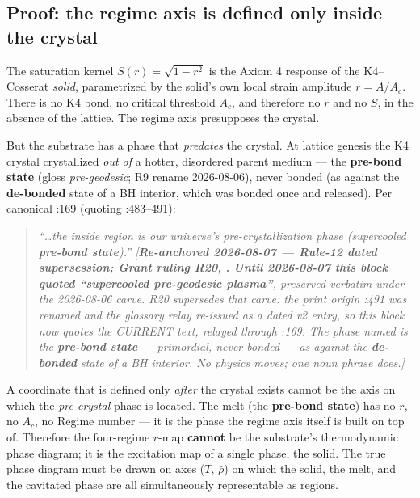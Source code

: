 \subsection{Proof: the regime axis is defined only inside the crystal}
\label{subsec:vol9_true_phase_proof}

The saturation kernel $S(r) = \sqrt{1 - r^2}$ is the Axiom 4 response of the K4--Cosserat \emph{solid}, parametrized by the solid's own local strain amplitude $r = A/A_c$. There is no K4 bond, no critical threshold $A_c$, and therefore no $r$ and no $S$, in the absence of the lattice. The regime axis presupposes the crystal.

But the substrate has a phase that \emph{predates} the crystal. At lattice genesis the K4 crystal crystallized \emph{out of} a hotter, disordered parent medium --- the \textbf{pre-bond state} (gloss \emph{pre-geodesic}; R9 rename 2026-08-06), never bonded (as against the \textbf{de-bonded} state of a BH interior, which was bonded once and released). Per canonical :169 (quoting :483--491):

\begin{quote}
\itshape ``\ldots the inside region is our universe's pre-crystallization phase (supercooled \textbf{pre-bond state}).'' \emph{[\textbf{Re-anchored 2026-08-07 --- Rule-12 dated supersession; Grant ruling R20, }\textbf{.} \textbf{Until 2026-08-07 this block quoted ``supercooled pre-geodesic plasma''}, preserved verbatim under the 2026-08-06 carve. R20 supersedes that carve: the print origin :491 was renamed and the glossary relay re-issued as a dated v2 entry, so this block now quotes the CURRENT text, relayed through :169. The phase named is the \textbf{pre-bond state} --- primordial, never bonded --- as against the \textbf{de-bonded} state of a BH interior. No physics moves; one noun phrase does.]}
\end{quote}

A coordinate that is defined only \emph{after} the crystal exists cannot be the axis on which the \emph{pre-crystal} phase is located. The melt (the \textbf{pre-bond state}) has no $r$, no $A_c$, no Regime number --- it is the phase the regime axis itself is built on top of. Therefore the four-regime $r$-map \textbf{cannot} be the substrate's thermodynamic phase diagram; it is the excitation map of a single phase, the solid. The true phase diagram must be drawn on axes ($T$, $\bar\rho$) on which the solid, the melt, and the cavitated phase are all simultaneously representable as regions.

